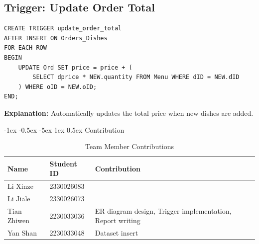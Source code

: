 \documentclass[12pt]{article}
\makeatletter
\renewcommand\section{\@startsection{section}{1}{\z@}%
    {-1ex \@plus -0.5ex \@minus -5ex} %
    {1ex \@plus 0.5ex} %
    {\normalfont\Large\bfseries}} %
\makeatother
\begin{document}
\subsection{Trigger: Update Order Total}
\begin{lstlisting}
CREATE TRIGGER update_order_total
AFTER INSERT ON Orders_Dishes
FOR EACH ROW
BEGIN
    UPDATE Ord SET price = price + (
        SELECT dprice * NEW.quantity FROM Menu WHERE dID = NEW.dID
    ) WHERE oID = NEW.oID;
END;
\end{lstlisting}
\textbf{Explanation:} Automatically updates the total price when new dishes are added.


\section{Contribution}

\begin{table}[htbp]
\centering
\caption{Team Member Contributions}
\begin{tabular}{llp{10cm}}
\toprule
\textbf{Name} & \textbf{Student ID} & \textbf{Contribution} \\
\midrule
Li Xinze & 2330026083 & \\
Li Jiale & 2330026073 &  \\
Tian Zhiwen & 2230033036 & ER diagram design, Trigger implementation, Report writing \\
Yan Shan & 2230033048 & Dataset insert \\
\bottomrule
\end{tabular}
\end{table}
\end{document}
